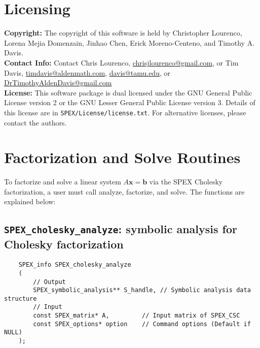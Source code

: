 \documentclass[12pt]{report}
\theoremstyle{definition}
\begin{document}
\section{Licensing} \label{s:Chol:licensing}

\textbf{Copyright:} The copyright of this software is held by  Christopher Lourenco, Lorena Mejia Domenzain, Jinhao Chen, Erick Moreno-Centeno, and Timothy A. Davis.\\

\noindent \textbf{Contact Info:} Contact Chris Lourenco,
\href{mailto:chrisjlourenco@gmail.com}{chrisjlourenco@gmail.com}, or Tim Davis,
\href{mailto:timdavis@aldenmath.com}{timdavis@aldenmath.com},
\href{mailto:davis@tamu.edu}{davis@tamu.edu}, or
\href{DrTimothyAldenDavis@gmail.com}{DrTimothyAldenDavis@gmail.com}\\

\noindent \textbf{License:} This software package is dual licensed under the GNU General Public License version 2 or the GNU Lesser General Public License version 3. Details of this license are in \verb|SPEX/License/license.txt|. For alternative licenses, please contact the authors.

\section{Factorization and Solve Routines}

To factorize and solve a linear system $A \mathbf{x} = \mathbf{b}$ via the SPEX Cholesky factorization, a user must call analyze, factorize, and solve. The functions are explained below:

\subsection{\texttt{SPEX\_cholesky\_analyze}: symbolic analysis for Cholesky factorization} \label{ss:spex_chol_analyze}

\begin{mdframed}[userdefinedwidth=6in]
{\footnotesize
\begin{verbatim}
    SPEX_info SPEX_cholesky_analyze
    (
        // Output
        SPEX_symbolic_analysis** S_handle, // Symbolic analysis data structure 
        // Input
        const SPEX_matrix* A,         // Input matrix of SPEX_CSC
        const SPEX_options* option    // Command options (Default if NULL)
    );
    \end{verbatim}
} \end{mdframed}
\end{document}
